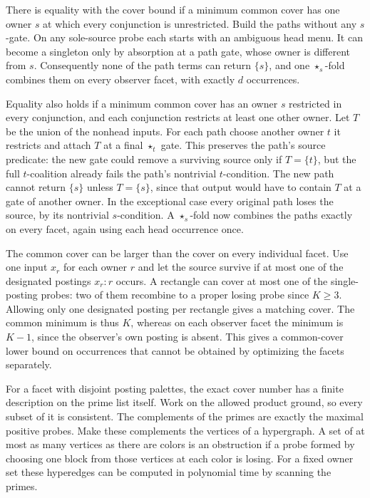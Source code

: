 There is equality with the cover bound if a minimum common
cover has one owner $s$ at which every conjunction is
unrestricted. Build the paths without any $s$-gate. On any
sole-source probe each starts with an ambiguous head menu.
It can become a singleton only by absorption at a path gate,
whose owner is different from $s$. Consequently none of the
path terms can return $\{s\}$, and one $\star_s$-fold combines
them on every observer facet, with exactly $d$ occurrences.

Equality also holds if a minimum common cover has an owner $s$
restricted in every conjunction, and each conjunction restricts
at least one other owner. Let $T$ be the union of the nonhead
inputs. For each path choose another owner $t$ it restricts and
attach $T$ at a final $\star_t$ gate. This preserves the path's
source predicate: the new gate could remove a surviving source
only if $T=\{t\}$, but the full $t$-coalition already fails the
path's nontrivial $t$-condition. The new path cannot return
$\{s\}$ unless $T=\{s\}$, since that output would have to
contain $T$ at a gate of another owner. In the exceptional case
every original path loses the source, by its nontrivial
$s$-condition. A $\star_s$-fold now combines the paths exactly
on every facet, again using each head occurrence once.

The common cover can be larger than the cover on every
individual facet. Use one input $x_r$ for each owner $r$ and
let the source survive if at most one of the designated
postings $x_r:r$ occurs. A rectangle can cover at most one of
the single-posting probes: two of them recombine to a proper
losing probe since $K\geq3$. Allowing only one designated
posting per rectangle gives a matching cover. The common
minimum is thus $K$, whereas on each observer facet the
minimum is $K-1$, since the observer's own posting is absent.
This gives a common-cover lower bound on occurrences that
cannot be obtained by optimizing the facets separately.

For a facet with disjoint posting palettes, the exact cover
number has a finite description on the prime list itself.
Work on the allowed product ground, so every subset of it is
consistent. The complements of the primes are exactly the
maximal positive probes. Make these complements the vertices
of a hypergraph. A set of at most as many vertices as there
are colors is an obstruction if a probe formed by choosing
one block from those vertices at each color is losing. For a
fixed owner set these hyperedges can be computed in polynomial
time by scanning the primes.

